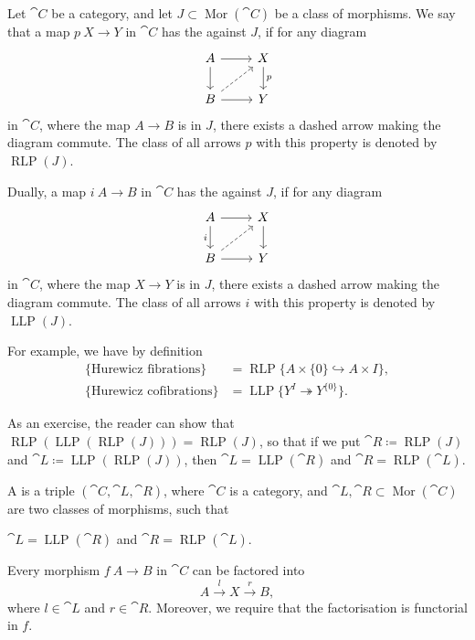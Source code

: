 \begin{definition}
    Let $\cat C$ be a category, and let $J\subset\operatorname{Mor}(\cat C)$ be a class of morphisms.
    We say that a map $p\:X\to Y$ in $\cat C$ has the  against $J$,
    if for any diagram
    \[ \begin{tikzcd}
        A\ar[r]\ar[d] & X\ar[d,"p"] \\
        B\ar[r]\ar[ur,dashed] & Y
    \end{tikzcd} \]
    in $\cat C$, where the map $A\to B$ is in $J$,
    there exists a dashed arrow making the diagram commute.
    The class of all arrows $p$ with this property is denoted by $\operatorname{RLP}(J)$.

    Dually, a map $i\:A\to B$ in $\cat C$ has the  against $J$,
    if for any diagram
    \[ \begin{tikzcd}
        A\ar[r]\ar[d,"i"'] & X\ar[d] \\
        B\ar[r]\ar[ur,dashed] & Y
    \end{tikzcd} \]
    in $\cat C$, where the map $X\to Y$ is in $J$,
    there exists a dashed arrow making the diagram commute.
    The class of all arrows $i$ with this property is denoted by $\operatorname{LLP}(J)$.
\end{definition}

For example, we have by definition
\[ \begin{aligned}
    \{\text{Hurewicz fibrations}\}
    &=\operatorname{RLP}\{A\times\{0\}\hookrightarrow A\times I\},\\
    \{\text{Hurewicz cofibrations}\}
    &=\operatorname{LLP}\{Y^I\twoheadrightarrow Y^{\{0\}}\}.
\end{aligned}\]

As an exercise, the reader can show that
$\operatorname{RLP}(\operatorname{LLP}(\operatorname{RLP}(J)))=\operatorname{RLP}(J)$,
so that if we put $\cat R\coloneq\operatorname{RLP}(J)$ and
$\cat L\coloneq\operatorname{LLP}(\operatorname{RLP}(J))$,
then $\cat L=\operatorname{LLP}(\cat R)$ and $\cat R=\operatorname{RLP}(\cat{L})$.

\begin{definition}
    A  is a triple $(\cat C,\cat L,\cat R)$,
    where $\cat C$ is a category, and
    $\cat L,\cat R\subset\operatorname{Mor}(\cat C)$ are two classes of morphisms,
    such that
    \begin{itms}
        \item $\cat L=\operatorname{LLP}(\cat R)$ and $\cat R=\operatorname{RLP}(\cat{L})$.
        \item Every morphism $f\:A\to B$ in $\cat C$ can be factored into
        \[A\xrightarrow lX\xrightarrow rB,\]
        where $l\in\cat L$ and $r\in\cat R$.
        Moreover, we require that the factorisation is functorial in $f$.
    \end{itms}
\end{definition}

